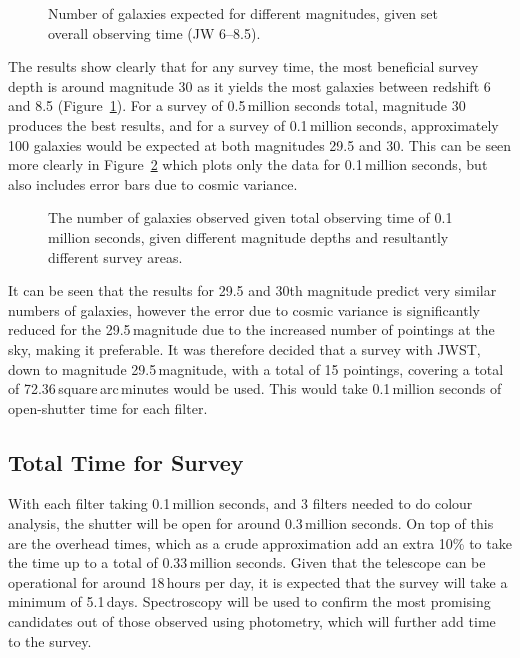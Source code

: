 		\begin{figure}[!htbp]
			\centering
				\begingroup{}
					\resizebox{0.8\textwidth}{!}{%
						
					}\endgroup
			\caption{Number of galaxies expected for different magnitudes, given set overall observing time (JW 6--8.5).\label{fig:galaxies_expected_JWST_6-8}}
		\end{figure}

		The results show clearly that for any survey time, the most beneficial survey depth is around magnitude 30 as it yields the most galaxies between redshift 6 and 8.5 (Figure~\ref{fig:galaxies_expected_JWST_6-8}). For a survey of 0.5\,million seconds total, magnitude 30 produces the best results, and for a survey of 0.1\,million seconds, approximately 100 galaxies would be expected at both magnitudes 29.5 and 30. This can be seen more clearly in Figure~\ref{fig:galaxies_expected_JWST_errors} which plots only the data for 0.1\,million seconds, but also includes error bars due to cosmic variance.
		\begin{figure}[!htbp]
			\centering
				\begingroup{}
					\resizebox{0.8\textwidth}{!}{%
						
					}\endgroup
			\caption{The number of galaxies observed given total observing time of 0.1\,million seconds, given different magnitude depths and resultantly different survey areas.\label{fig:galaxies_expected_JWST_errors}}
		\end{figure}

		It can be seen that the results for 29.5 and 30th magnitude predict very similar numbers of galaxies, however the error due to cosmic variance is significantly reduced for the 29.5\,magnitude due to the increased number of pointings at the sky, making it preferable. It was therefore decided that a survey with JWST, down to magnitude 29.5\,magnitude, with a total of 15 pointings, covering a total of 72.36\,square\,arc\,minutes would be used. This would take 0.1\,million seconds of open-shutter time for each filter.

	\subsection{Total Time for Survey} %
	\label{sub:total_time_for_survey}
		With each filter taking 0.1\,million seconds, and 3 filters needed to do colour analysis, the shutter will be open for around 0.3\,million seconds. On top of this are the overhead times, which as a crude approximation add an extra 10\% to take the time up to a total of 0.33\,million seconds. Given that the telescope can be operational for around 18\,hours per day, it is expected that the survey will take a minimum of 5.1\,days. Spectroscopy will be used to confirm the most promising candidates out of those observed using photometry, which will further add time to the survey.
